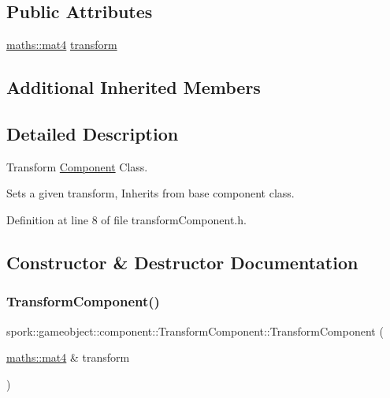 \subsection*{Public Attributes}
\begin{DoxyCompactItemize}
\item 
\hyperlink{structspork_1_1maths_1_1mat4}{maths\+::mat4} \hyperlink{classspork_1_1gameobject_1_1component_1_1_transform_component_a326265123b0804f6e947cb0dd16f5492}{transform}
\end{DoxyCompactItemize}
\subsection*{Additional Inherited Members}


\subsection{Detailed Description}
Transform \hyperlink{classspork_1_1gameobject_1_1component_1_1_component}{Component} Class. 

Sets a given transform, Inherits from base component class. 

Definition at line 8 of file transform\+Component.\+h.



\subsection{Constructor \& Destructor Documentation}
\mbox{\label{classspork_1_1gameobject_1_1component_1_1_transform_component_a44807997fbb8f6a76899bcb4d465c9c2}} 
\subsubsection{\texorpdfstring{Transform\+Component()}{TransformComponent()}}
{\footnotesize\ttfamily spork\+::gameobject\+::component\+::\+Transform\+Component\+::\+Transform\+Component (\begin{DoxyParamCaption}\item[{\hyperlink{structspork_1_1maths_1_1mat4}{maths\+::mat4} \&}]{transform }\end{DoxyParamCaption})}




